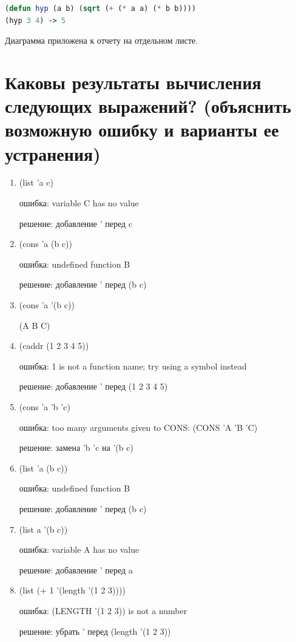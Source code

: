 \documentclass[12pt]{report}
\begin{document}
\begin{lstlisting}[language=Lisp]
(defun hyp (a b) (sqrt (+ (* a a) (* b b))))
(hyp 3 4) -> 5
\end{lstlisting}

Диаграмма приложена к отчету на отдельном листе.
 

\section{Каковы результаты вычисления следующих выражений? (объяснить возможную ошибку и варианты ее устранения)}

\begin{enumerate}
    \item (list 'a c)
    
    ошибка: variable C has no value
        
    решение: добавление ' перед c

    \item (cons 'a (b c))

    ошибка: undefined function B
    
    решение: добавление ' перед (b c)

    \item (cons 'a '(b c))

    (A B C)

    \item (caddr (1 2 3 4 5))

    ошибка: 1 is not a function name; try using a symbol instead

    решение: добавление ' перед (1 2 3 4 5)

    \item (cons 'a 'b 'c)

    ошибка: too many arguments given to CONS: (CONS 'A 'B 'C)

    решение: замена 'b 'c на '(b c)

    \item (list 'a (b c))

    ошибка: undefined function B

    решение: добавление ' перед (b c)

    \item (list a '(b c))

    ошибка: variable A has no value

    решение: добавление ' перед a

    \item (list (+ 1 '(length '(1 2 3))))

    ошибка: (LENGTH '(1 2 3)) is not a number

    решение: убрать ' перед (length '(1 2 3))
\end{enumerate}
\end{document}
